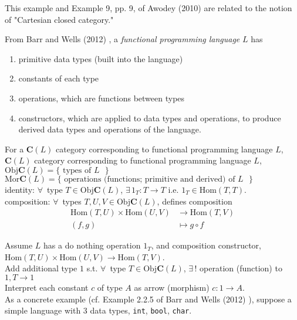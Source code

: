 \documentclass[10pt]{amsart}
\begin{document}
\begin{multicols*}{2}
\begin{itemize}
This example and Example 9, pp. 9, of Awodey (2010) \cite{Awod2010} are related to the notion of "Cartesian closed category."

From Barr and Wells (2012) \cite{BaWe2012}, a \emph{functional programming language} $L$ has
\begin{enumerate}
	\item primitive data types (built into the language) 
	\item constants of each type
	\item operations, which are functions between types
	\item constructors, which are applied to data types and operations, to produce derived data types and operations of the language.	
\end{enumerate}

	For a $\mathbf{C}(L)$ category corresponding to functional programming language $L$, \\
	
	$\mathbf{C}(L)$ category corresponding to functional programming language $L$, \\
	$\text{Obj}\mathbf{C}(L) = \lbrace \text{ types of $L$ } \rbrace$ \\
	$\text{Mor}\mathbf{C}(L) = \lbrace \text{ operations (functions; primitive and derived) of $L$ } \rbrace$ \\

identity: $\forall \, $ type $T \in \text{Obj}\mathbf{C}(L)$, $\exists \, 1_T :T \to T$ i.e. $1_T \in \text{Hom}(T,T)$. \\

composition: $\forall \, $ types $T,U,V \in \text{Obj}\mathbf{C}(L)$, defines composition 
\[
\begin{aligned}
\text{Hom}(T,U) \times \text{Hom}(U,V) & \to \text{Hom}(T,V) \\ 
(f,g) & \mapsto g \circ f
\end{aligned}
\]

Assume $L$ has a do nothing operation $1_T$, and composition constructor, $\text{Hom}(T,U) \times \text{Hom}(U,V) \to \text{Hom}(T, V)$. \\

Add additional type $1$ s.t. $\forall \, $ type $T \in \text{Obj}\mathbf{C}(L)$, $\exists \, !$ operation (function) to $1, T \to 1$ \\
Interpret each constant $c$ of type $A$ as arrow (morphism) $c:1\to A$.  \\

As a concrete example (cf. Example 2.2.5 of Barr and Wells (2012) \cite{BaWe2012}), suppose a simple language with 3 data types, \texttt{int}, \texttt{bool}, \texttt{char}. \\


\end{itemize}
\end{multicols*}
\end{document}
